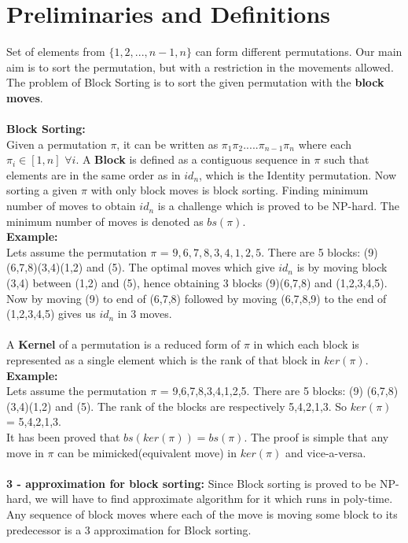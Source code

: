 \documentclass[BTech]{iitmdiss}
\begin{document}
\section{Preliminaries and Definitions}
Set of elements from $\{1,2,...,n-1,n\}$ can form different permutations. Our main aim is to sort the permutation, but with a restriction in the movements allowed. The problem of Block Sorting is to sort the given permutation with the \textbf{block moves}.\\~\\
\textbf{Block Sorting:}\\
Given a permutation $\pi$, it can be written as $\pi_1\pi_2.....\pi_{n-1}\pi_{n}$ where each $\pi_i \in [1,n]$ $\forall i$. A \textbf{Block} is defined as a contiguous sequence in $\pi$ such that elements are in the same order as in $id_n$, which is the Identity permutation. Now sorting a given $\pi$ with only block moves is block sorting. Finding minimum number of moves to obtain $id_n$ is a challenge which is proved to be NP-hard. The minimum number of moves is denoted as $bs(\pi)$.\\
\textbf{Example:}\\
Lets assume the permutation $\pi$ = $9,6,7,8,3,4,1,2,5.$ There are 5 blocks: (9) 	(6,7,8)(3,4)(1,2) and (5). The optimal moves which give $id_n$ is by moving block (3,4) between (1,2) and (5), hence obtaining 3 blocks (9)(6,7,8) and (1,2,3,4,5). Now by moving (9) to end of (6,7,8) followed by moving (6,7,8,9) to the end of (1,2,3,4,5) gives us $id_n$ in 3 moves.\\~\\
\noindent
A \textbf{Kernel} of a permutation is a reduced form of $\pi$ in which each block is represented as a single element which is the rank of that block in $ker(\pi)$.\\
\textbf{Example:}\\
Lets assume the permutation $\pi$ = 9,6,7,8,3,4,1,2,5. There are 5 blocks: (9)
(6,7,8)(3,4)(1,2) and (5). The rank of the blocks are respectively 5,4,2,1,3. So $ker(\pi)$ = 5,4,2,1,3.\\
It has been proved that $bs(ker(\pi)) = bs(\pi)$. The proof is simple that any move in $\pi$ can be mimicked(equivalent move) in $ker(\pi)$ and vice-a-versa.\\~\\
\noindent
\textbf{3 - approximation for block sorting:} 
Since Block sorting is proved to be NP-hard, we will have to find approximate algorithm for it which runs in poly-time. Any sequence of block moves where each of the move is moving some block to its predecessor is a 3 approximation for Block sorting.\\
\end{document}
